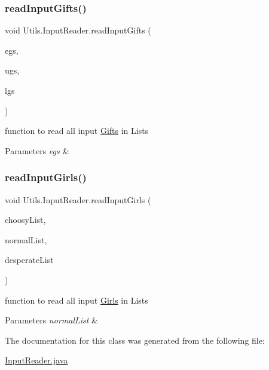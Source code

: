 \subsubsection{\texorpdfstring{read\+Input\+Gifts()}{readInputGifts()}}
{\footnotesize\ttfamily void Utils.\+Input\+Reader.\+read\+Input\+Gifts (\begin{DoxyParamCaption}\item[{Array\+List$<$ \hyperlink{class_gifts_1_1_essential_gift}{Essential\+Gift} $>$}]{egs,  }\item[{Array\+List$<$ \hyperlink{class_gifts_1_1_utility_gift}{Utility\+Gift} $>$}]{ugs,  }\item[{Array\+List$<$ \hyperlink{class_gifts_1_1_luxury_gift}{Luxury\+Gift} $>$}]{lgs }\end{DoxyParamCaption})\hspace{0.3cm}{\ttfamily [inline]}}

function to read all input \hyperlink{namespace_gifts}{Gifts} in Lists 
\begin{DoxyParams}{Parameters}
{\em egs} & \\
\hline
\end{DoxyParams}
\mbox{\label{class_utils_1_1_input_reader_a2f95d37f265a7a62b792822e160a16c2}} 
\subsubsection{\texorpdfstring{read\+Input\+Girls()}{readInputGirls()}}
{\footnotesize\ttfamily void Utils.\+Input\+Reader.\+read\+Input\+Girls (\begin{DoxyParamCaption}\item[{Array\+List$<$ \hyperlink{class_girls_1_1_choosy_girl}{Choosy\+Girl} $>$}]{choosy\+List,  }\item[{Array\+List$<$ \hyperlink{class_girls_1_1_normal_girl}{Normal\+Girl} $>$}]{normal\+List,  }\item[{Array\+List$<$ \hyperlink{class_girls_1_1_desperate_girl}{Desperate\+Girl} $>$}]{desperate\+List }\end{DoxyParamCaption})\hspace{0.3cm}{\ttfamily [inline]}}

function to read all input \hyperlink{namespace_girls}{Girls} in Lists 
\begin{DoxyParams}{Parameters}
{\em normal\+List} & \\
\hline
\end{DoxyParams}


The documentation for this class was generated from the following file\+:\begin{DoxyCompactItemize}
\item 
\hyperlink{_input_reader_8java}{Input\+Reader.\+java}\end{DoxyCompactItemize}
